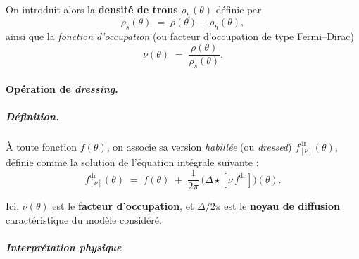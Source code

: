 On introduit alors la \textbf{densité de trous} $\rho_h(\theta)$ définie par
\begin{equation}
	\rho_s(\theta) \;=\; \rho(\theta) + \rho_h(\theta),
\end{equation}
ainsi que la \emph{fonction d’occupation} (ou facteur d’occupation de type Fermi–Dirac)
\begin{equation}\label{eq:TBA-nu}
	\nu(\theta) \;=\; \frac{\rho(\theta)}{\rho_s(\theta)}.
\end{equation}

\paragraph{Opération de \emph{dressing}.}

\subparagraph{Définition.}  
À toute fonction $f(\theta)$, on associe sa version \emph{habillée} (ou \emph{dressed}) $f^{\mathrm{dr}}_{[\nu]}(\theta)$, définie comme la solution de l’équation intégrale suivante :
\begin{equation}\label{eq:dressing}
	f^{\mathrm{dr}}_{[\nu]}(\theta) 
	\;=\; f(\theta) \;+\; \frac{1}{2\pi}\,\bigl(\Delta \star [\nu\, f^{\mathrm{dr}}]\bigr)(\theta).
\end{equation}

Ici, $\nu(\theta)$ est le \textbf{facteur d’occupation}, et $\Delta/2\pi$ est le \textbf{noyau de diffusion} caractéristique du modèle considéré.  

\medskip

\subparagraph{Interprétation physique}

